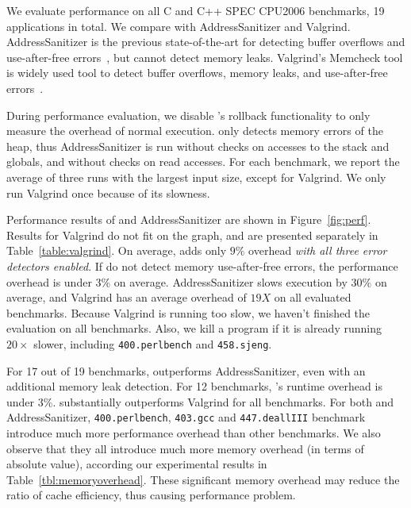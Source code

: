 We evaluate performance on all C and C++ SPEC CPU2006 benchmarks, 19 applications in total. We compare \doubletake{} with AddressSanitizer and Valgrind. AddressSanitizer is the previous state-of-the-art for detecting buffer overflows and use-after-free errors~\cite{AddressSanitizer}, but cannot detect memory leaks. Valgrind's Memcheck tool is widely used tool to detect buffer overflows, memory leaks, and use-after-free errors~\cite{overflow:valgrind}. 

During performance evaluation, we disable \doubletake{}'s rollback functionality to only measure the overhead of normal execution. \doubletake{} only detects memory errors of the heap, thus AddressSanitizer is run without checks on accesses to the stack and globals, and without checks on read accesses. For each benchmark, we report the average of three runs with the largest input size, except for Valgrind. We only run Valgrind once because of its slowness. 

Performance results of \doubletake{} and AddressSanitizer are shown in Figure~\ref{fig:perf}. Results for Valgrind do not fit on the graph, and are presented separately in Table~\ref{table:valgrind}. On average, \doubletake{} adds only $9\%$ overhead \emph{with all three error detectors enabled}. If \doubletake{} do not detect memory use-after-free errors, the performance overhead is under 3\% on average. AddressSanitizer slows execution by $30\%$ on average, and Valgrind has an average overhead of $19X$ on all evaluated benchmarks. Because Valgrind is running too slow, we haven't finished the evaluation on all benchmarks. Also, we kill a program if it is already running $20\times$ slower, including \texttt{400.perlbench} and \texttt{458.sjeng}. 

For 17 out of 19 benchmarks, \doubletake{} outperforms AddressSanitizer, even with an additional memory leak detection. For 12 benchmarks, \doubletake{}'s runtime overhead is under 3\%. \doubletake{} substantially outperforms Valgrind for all benchmarks. For both \doubletake{} and AddressSanitizer,  \texttt{400.perlbench}, \texttt{403.gcc} and \texttt{447.deallIII} benchmark introduce much more performance overhead than other benchmarks. We also observe that they all introduce much more memory overhead (in terms of absolute value), according our experimental results in Table~\ref{tbl:memoryoverhead}. These significant memory overhead may reduce the ratio of cache efficiency, thus causing performance problem. 



